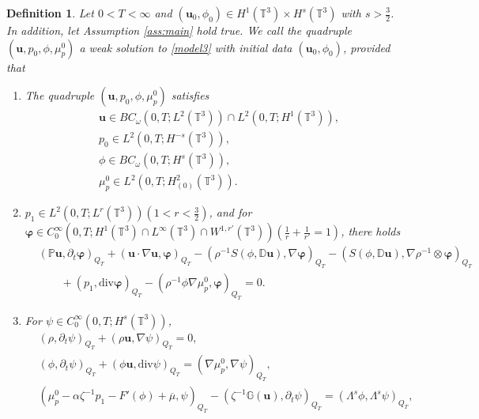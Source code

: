 \documentclass[reqno,a4paper,11pt]{amsart}
\theoremstyle{plain}
\newtheorem{definition}[theorem]{Definition}
\numberwithin{equation}{section}
\newcommand{\bb}[1]{\mathbb{#1}}
\newcommand{\bbt}{\bb{T}}
\newcommand{\bu}{\mathbf{u}}
\begin{document}
	\begin{definition}
		\label{def:weak-solutions}
		Let $0<T <\infty$ and $ (\bu_0,\phi_0) \in H^1(\bbt^3) \times H^s(\bbt^3) $ with $s>\frac{3}{2}$.
		In addition, let Assumption \ref{ass:main} hold true. We call the quadruple $(\bu,p_0,\phi,\mu_p^0)$ a weak solution to \eqref{model3} with initial data $(\bu_0,\phi_0)$, provided that
		\begin{enumerate}
			\item The quadruple $(\bu,p_0,\phi,\mu_p^0)$ satisfies
			\begin{align*}
				&\mathbf{u}\in BC_{\omega}(0,T; L^{2}(\mathbb{T}^{3}))\cap L^{2}(0,T; H^{1}(\mathbb{T}^{3})),
				\\&p_0\in L^2(0,T; H^{-s}(\mathbb{T}^{3})),
				\\&\phi\in BC_{\omega}(0,T; H^{s}(\mathbb{T}^{3})),
				\\& \mu_{p}^{0}\in L^{2}(0,T; H^{2}_{(0)}(\mathbb{T}^{3})).
			\end{align*}
			\item $p_1\in L^{2}(0,T;L^{r}(\mathbb{T}^{3}))(1<r<\frac{3}{2})$, and for $\boldsymbol{\varphi}\in C_{0}^{\infty}(0,T;H^1(\bbt^3) \cap L^{\infty}(\mathbb{T}^{3})\cap W^{1,r'}(\mathbb{T}^{3})) (\frac{1}{r}+\frac{1}{r'}=1)$, there holds
			\begin{align}\label{mweak1}
				&\nonumber(\mathbb{P}\mathbf{u},\partial_{t}\boldsymbol{\varphi})_{Q_{T}}+(\mathbf{u}\cdot\nabla\mathbf{u},\boldsymbol{\varphi})_{Q_{T}}-(\rho^{-1}S(\phi,\mathbb{ D}\mathbf{u}),\nabla\boldsymbol{\varphi})_{Q_{T}}-(S(\phi,\mathbb{ D}\mathbf{u}),\nabla\rho^{-1}\otimes\boldsymbol{\varphi})_{Q_{T}}
				\\&\qquad
				+(p_{1},\mathrm{div}\boldsymbol{\varphi})_{Q_{T}}-(\rho^{-1}\phi \nabla \mu_{p}^{0},\boldsymbol{\varphi})_{Q_{T}}
				=0.
			\end{align}
			\item For  $\psi\in C_{0}^{\infty}(0,T; H^{s}(\mathbb{T}^{3}))$,
			\begin{align}
				&\label{mweak2}(\rho,\partial_{t}\psi)_{Q_{T}}+(\rho\mathbf{u}, \nabla\psi)_{Q_{T}}=0,
				\\&\label{mweak3}(\phi,\partial_{t}\psi)_{Q_{T}}+(\phi\mathbf{u},\mathrm{div}\psi)_{Q_{T}}=( \nabla \mu_{p}^{0},\nabla\psi)_{Q_{T}},
				\\&\label{mweak4}(\mu_{p}^{0}-\alpha\zeta^{-1} p_{1}-F'(\phi)+\overline{\mu},\psi)_{Q_{T}}-(\zeta^{-1}\mathbb{G}(\mathbf{u}),\partial_{t}\psi)_{Q_{T}}=(\Lambda^{s}\phi,\Lambda^{s}\psi)_{Q_{T}},

\end{align}
\end{enumerate}
\end{definition}
\end{document}
